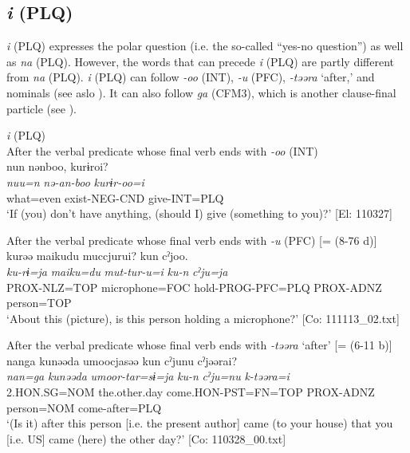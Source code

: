 \begin{xlist}
\subsection{\textit{i} (PLQ)}\label{sec:10.3.3}

\textit{i} (PLQ) expresses the polar question (i.e. the so-called “yes-no question”) as well as \textit{na} (PLQ). However, the words that can precede \textit{i} (PLQ) are partly different from \textit{na} (PLQ). \textit{i} (PLQ) can follow \textit{{}-oo} (INT), \textit{{}-u} (PFC), \textit{{}-təəra} ‘after,’ and nominals (see aslo ). It can also follow \textit{ga} (CFM3), which is another clause-final particle (see ).

\ea\label{ex:10.45}   \textit{i} (PLQ)\\
  \ea After the verbal predicate whose final verb ends with \textit{-oo} (INT)\\
      \glll    nun  nənboo,  kurɨroi?\\
    \textit{nuu=n}  \textit{nə-an-boo}  \textit{kurɨr-oo=i}\\
    what=even  exist-NEG-CND  give-INT=PLQ\\
    \glt     ‘If (you) don’t have anything, (should I) give (something to you)?’ [El: 110327]

  \ex After the verbal predicate whose final verb ends with \textit{-u} (PFC) [= (8-76 d)]\\
      \glll    kurəə  {\textbar}maiku{\textbar}du  muccjurui? kun  cˀjoo.\\                                                               
    \textit{ku-rɨ=ja}  \textit{maiku=du}  \textit{mut-tur-u=i}  \textit{ku-n}  \textit{cˀju=ja}\\                                                               
    PROX-NLZ=TOP  microphone=FOC  hold-PROG-PFC=PLQ  PROX-ADNZ  person=TOP \\
    \glt ‘About this (picture), is this person holding a microphone?’ [Co: 111113\_02.txt]

  \ex After the verbal predicate whose final verb ends with \textit{{}-təəra} ‘after’ [= (6-11 b)]\\
      \glll    nanga  kunəəda  umoocjasəə  kun   cˀjunu  cˀjəərai?\\
    \textit{nan=ga}  \textit{kunəəda}  \textit{umoor-tar=sɨ=ja}  \textit{ku-n}  \textit{cˀju=nu}  \textit{k-təəra=i}\\
    2.HON.SG=NOM  the.other.day  come.HON-PST=FN=TOP  PROX-ADNZ   person=NOM  come-after=PLQ\\
\glt     ‘(Is it) after this person [i.e. the present author] came (to your house) that you [i.e. US] came (here) the other day?’  [Co: 110328\_00.txt]


\end{xlist}
